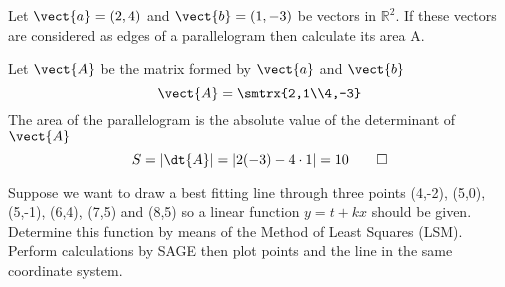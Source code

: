 \begin{exercise}
Let $\vect{a}=(2,4)$ and $\vect{b}=(1,-3)$ be vectors in $\mathbb{R}^2$. If these vectors are considered as edges of a parallelogram then calculate its area A. 
\end{exercise}

\begin{solution}
Let $\vect{A}$ be the matrix formed by $\vect{a}$ and $\vect{b}$
\[ \vect{A}=\smtrx{2,1\\4,-3} \]
The area of the parallelogram is the absolute value of the determinant of $\vect{A}$
\[ S=\vert \dt{A}\vert = \vert 2(-3)-4\cdot 1 \vert =10 \qedhere \]
\end{solution}

\begin{exercise}
Suppose we want to draw a best fitting line through three points (4,-2), (5,0), (5,-1), (6,4), (7,5) and (8,5) so a linear function $y=t+kx$ should be given. Determine this function by means of the Method of Least Squares (LSM). Perform calculations by SAGE then plot points and the line in the same coordinate system.
\end{exercise}


